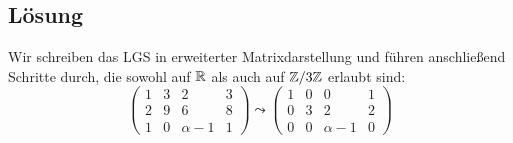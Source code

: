 \subsection{Lösung}
Wir schreiben das LGS in erweiterter Matrixdarstellung und führen anschließend Schritte durch, die sowohl auf \( \mathbb{R} \) als auch auf \( \mathbb{Z}/3\mathbb{Z} \) erlaubt sind:
\begin{equation*}
	\left( \begin{array}{ccc|c}
		1 & 3 & 2 & 3 \\
		2 & 9 & 6 & 8 \\
		1 & 0 & \alpha-1 & 1 
	\end{array} \right) \leadsto \left( \begin{array}{ccc|c}
		1 & 0 & 0 & 1 \\
		0 & 3 & 2 & 2 \\
		0 & 0 & \alpha-1 & 0
	\end{array} \right)
\end{equation*}
